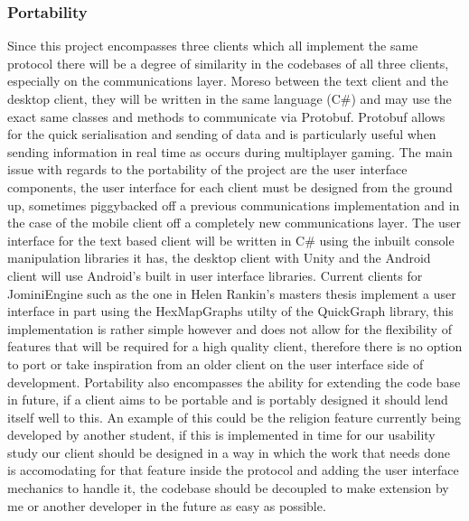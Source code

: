 \documentclass{article}
\begin{document}
	\subsubsection{Portability}
	Since this project encompasses three clients which all implement the same protocol there will be a degree of similarity in the codebases of all three clients, especially on the communications layer. Moreso between the text client and the desktop client, they will be written in the same language (C\#) and may use the exact same classes and methods to communicate via Protobuf\cite{Protobuf}. Protobuf allows for the quick serialisation and sending of data and is particularly useful when sending information in real time as occurs during multiplayer gaming. The main issue with regards to the portability of the project are the user interface components, the user interface for each client must be designed from the ground up, sometimes piggybacked off a previous communications implementation and in the case of the mobile client off a completely new communications layer. The user interface for the text based client will be written in C\# using the inbuilt console manipulation libraries it has\cite{ConsoleClass}, the desktop client with Unity\cite{Unity3D} and the Android client will use Android's built in user interface libraries\cite{AndroidUI}. Current clients for JominiEngine such as the one in Helen Rankin's masters thesis\cite{helenrankin} implement a user interface in part using the HexMapGraphs utilty of the QuickGraph library\cite{QuickGraph}, this implementation is rather simple however and does not allow for the flexibility of features that will be required for a high quality client, therefore there is no option to port or take inspiration from an older client on the user interface side of development. Portability also encompasses the ability for extending the code base in future, if a client aims to be portable and is portably designed it should lend itself well to this. An example of this could be the religion feature currently being developed by another student, if this is implemented in time for our usability study our client should be designed in a way in which the work that needs done is accomodating for that feature inside the protocol and adding the user interface mechanics to handle it, the codebase should be decoupled to make extension by me or another developer in the future as easy as possible.
\end{document}
